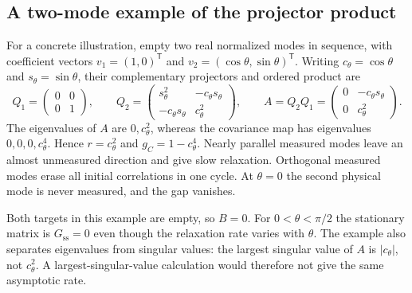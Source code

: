 \documentclass[aps,prb,onecolumn,nofootinbib,superscriptaddress,floatfix]{revtex4-2}
\newcommand{\steady}{\mathrm{ss}}
\begin{document}
\subsection{A two-mode example of the projector product}
For a concrete illustration, empty two real normalized modes in
sequence, with coefficient vectors
$v_1=(1,0)^{\mathsf T}$ and
$v_2=(\cos\theta,\sin\theta)^{\mathsf T}$.
Writing $c_\theta=\cos\theta$ and $s_\theta=\sin\theta$, their
complementary projectors and ordered product are
\begin{equation}
 Q_1=\begin{pmatrix}0&0\\0&1\end{pmatrix},\qquad
 Q_2=\begin{pmatrix}s_\theta^2&-c_\theta s_\theta\\
              -c_\theta s_\theta&c_\theta^2\end{pmatrix},\qquad
 A=Q_2Q_1=\begin{pmatrix}0&-c_\theta s_\theta\\
                          0&c_\theta^2\end{pmatrix}.
 \label{eq:two_mode_product}
\end{equation}
The eigenvalues of $A$ are $0,c_\theta^2$, whereas the covariance
map has eigenvalues $0,0,0,c_\theta^4$. Hence
$r=c_\theta^2$ and $g_C=1-c_\theta^4$. Nearly parallel measured
modes leave an almost unmeasured direction and give slow
relaxation. Orthogonal measured modes erase all initial
correlations in one cycle. At $\theta=0$ the second physical mode
is never measured, and the gap vanishes.

Both targets in this example are empty, so $B=0$. For
$0<\theta<\pi/2$ the stationary matrix is $G_\steady=0$ even
though the relaxation rate varies with $\theta$. The example also
separates eigenvalues from singular values: the largest singular
value of $A$ is $|c_\theta|$, not $c_\theta^2$. A largest-singular-value
calculation would therefore not give the same asymptotic rate.
\end{document}
